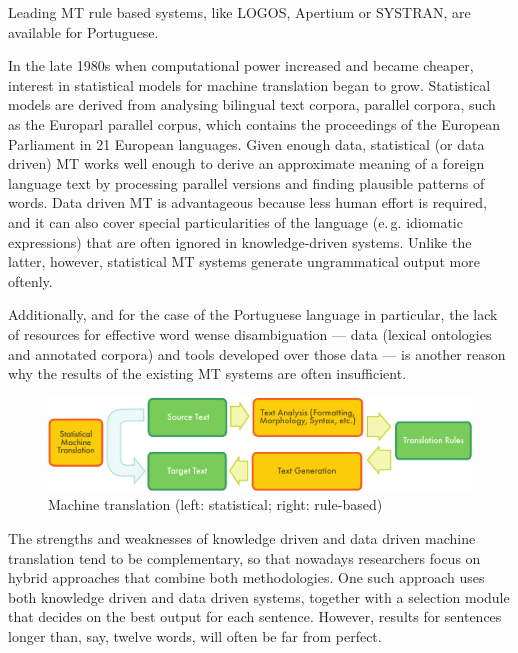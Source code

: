 \begin{multicols}{2}
Leading MT rule based systems, like LOGOS, Apertium or SYSTRAN, are available for Portuguese. 

In the late 1980s when computational power increased and became cheaper, interest in statistical models for machine translation began to grow. Statistical models are derived from analysing bilingual text corpora, parallel corpora, such as the Europarl parallel corpus, which contains the proceedings of the European Parliament in 21 European languages. Given enough data, statistical (or data driven) MT works well enough to derive an approximate meaning of a foreign language text by processing parallel versions and finding plausible patterns of words. Data driven MT is advantageous because less human effort is required, and it can also cover special particularities of the language (e.\,g. idiomatic expressions) that are often ignored in knowledge-driven systems.
Unlike the latter, however, statistical MT systems generate ungrammatical output more oftenly.  

Additionally, and for the case of the Portuguese language in particular, the lack of resources for effective word wense disambiguation 
--- data (lexical ontologies and annotated corpora) and tools developed over those data --- 
is another reason why the results of the existing MT systems are often insufficient. 

\begin{figure}[htb]
  \center
  \includegraphics[width=\textwidth]{../_media/english/machine_translation}
  \caption{Machine translation (left: statistical; right: rule-based)}
  \label{fig:mtarch_en}
\end{figure}

The strengths and weaknesses of knowledge driven and data driven machine translation tend to be complementary, so that nowadays researchers focus on hybrid approaches that combine both methodologies. One such approach uses both knowledge driven and data driven systems, together with a selection module that decides on the best output for each sentence. However, results for sentences longer than, say, twelve words, will often be far from perfect.


\end{multicols}

